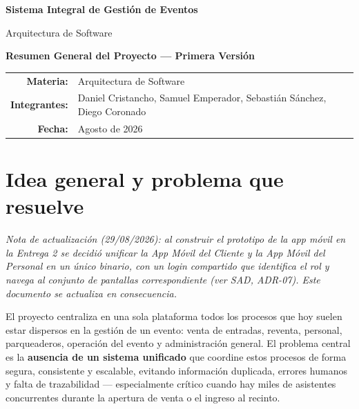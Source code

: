 \documentclass[12pt,a4paper]{article}
\begin{document}
\begin{titlepage}
\centering
\vspace*{2cm}
{\Huge\bfseries Sistema Integral de Gestión de Eventos\par}
\vspace{0.7cm}
{\Large Arquitectura de Software\par}
\vspace{1.2cm}
{\Large\bfseries Resumen General del Proyecto --- Primera Versión\par}
\vspace{2cm}
\vfill
\begin{tabular}{rl}
\textbf{Materia:} & Arquitectura de Software\\
\textbf{Integrantes:} & Daniel Cristancho, Samuel Emperador, Sebastián Sánchez, Diego Coronado\\
\textbf{Fecha:} & Agosto de 2026
\end{tabular}
\end{titlepage}

\tableofcontents
\newpage

\section{Idea general y problema que resuelve}

\textit{Nota de actualización (29/08/2026): al construir el prototipo de la app móvil en la
Entrega 2 se decidió unificar la App Móvil del Cliente y la App Móvil del Personal en un único
binario, con un login compartido que identifica el rol y navega al conjunto de pantallas
correspondiente (ver SAD, ADR-07). Este documento se actualiza en consecuencia.}

El proyecto centraliza en una sola plataforma todos los procesos que hoy suelen estar dispersos
en la gestión de un evento: venta de entradas, reventa, personal, parqueaderos, operación del
evento y administración general. El problema central es la \textbf{ausencia de un sistema
unificado} que coordine estos procesos de forma segura, consistente y escalable, evitando
información duplicada, errores humanos y falta de trazabilidad --- especialmente crítico cuando
hay miles de asistentes concurrentes durante la apertura de venta o el ingreso al recinto.
\end{document}
